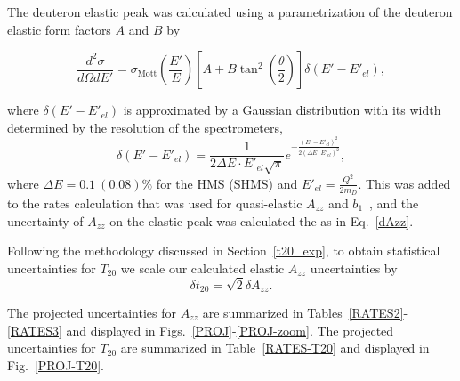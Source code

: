 The deuteron elastic peak was calculated using a parametrization of the deuteron elastic form factors $A$ and $B$ by

\begin{equation}
\frac{d^2 \sigma}{d\Omega dE'} = \sigma_{\mathrm{Mott}}\left(\frac{E'}{E}\right)\left[ A + B \tan ^2 \left( \frac{\theta}{2} \right) \right] \delta (E'-E'_{el}),
\end{equation}

where $\delta(E'-E'_{el})$ is approximated by a Gaussian distribution with its width determined by the resolution of the spectrometers, 
\begin{equation}
\delta(E'-E'_{el}) = \frac{1}{2\Delta E\cdot E'_{el}\sqrt{\pi}}e^{-\frac{(E'-E'_{el})^2}{2(\Delta E\cdot E'_{el})^2}}, 
\end{equation}
where $\Delta E=0.1 ~(0.08)\%$ for the HMS (SHMS) and $E'_{el}=\frac{Q^2}{2m_D}.$ This was added to the rates calculation that was used for quasi-elastic $A_{zz}$ and $b_1$~\cite{Long:2013tn}, and the uncertainty of $A_{zz}$ on the elastic peak was calculated the as in Eq.~\ref{dAzz}.

Following the methodology discussed in Section~\ref{t20_exp}, to obtain statistical uncertainties for $T_{20}$ we scale our calculated elastic $A_{zz}$ uncertainties by
\begin{equation}
\delta t_{20} = \sqrt{2}\delta A_{zz}.
\end{equation}

The projected uncertainties for $A_{zz}$ are summarized in Tables~\ref{RATES2}-\ref{RATES3} and displayed in Figs.~\ref{PROJ}-\ref{PROJ-zoom}. The projected uncertainties for $T_{20}$ are summarized in Table~\ref{RATES-T20} and displayed in Fig.~\ref{PROJ-T20}.  






